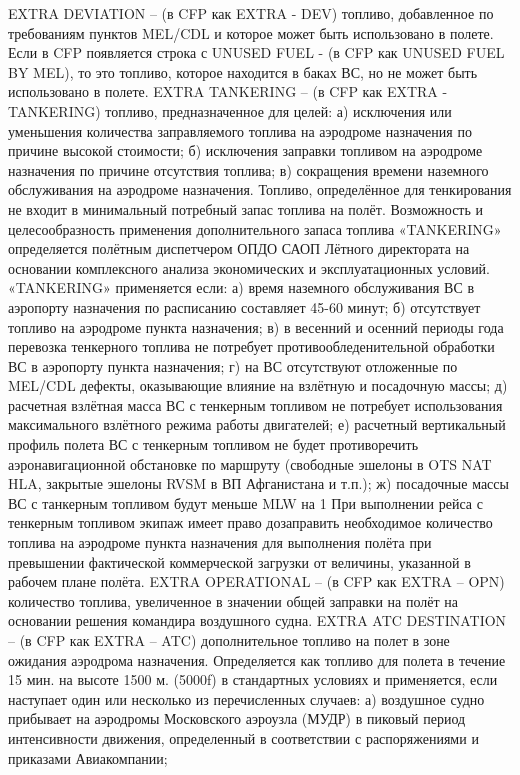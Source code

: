 EXTRA DEVIATION – (в CFP как EXTRA - DEV) топливо, добавленное по требованиям пунктов MEL/CDL и которое может быть использовано в полете. 
Если в CFP появляется строка с UNUSED FUEL - (в CFP как UNUSED FUEL BY MEL), то это топливо, которое находится в баках ВС, но не может быть использовано в полете. 
EXTRA TANKERING – (в CFP как EXTRA - TANKERING) топливо, предназначенное для целей: 
а)	исключения или уменьшения количества заправляемого топлива на аэродроме назначения по причине высокой стоимости; 
б)	исключения заправки топливом на аэродроме назначения по причине отсутствия топлива; 
в)	сокращения времени наземного обслуживания на аэродроме назначения. 
Топливо, определённое для тенкирования не входит в минимальный потребный запас топлива на полёт. 
 Возможность и целесообразность применения дополнительного запаса топлива «TANKERING» определяется полётным диспетчером ОПДО САОП Лётного директората на основании комплексного анализа экономических и эксплуатационных условий. «TANKERING» применяется если: 
а)	время наземного обслуживания ВС в аэропорту назначения по расписанию составляет 45-60 минут; 
б)	отсутствует топливо на аэродроме пункта назначения; 
в)	в весенний и осенний периоды года перевозка тенкерного топлива не потребует противообледенительной обработки ВС в аэропорту пункта назначения; 
г)	на ВС отсутствуют отложенные по MEL/CDL дефекты, оказывающие влияние на взлётную и посадочную массы; 
д)	расчетная взлётная масса ВС с тенкерным топливом не потребует использования максимального взлётного режима работы двигателей; 
е)	расчетный вертикальный профиль полета ВС с тенкерным топливом не будет противоречить аэронавигационной обстановке по маршруту (свободные эшелоны в OTS NAT HLA, закрытые эшелоны RVSM в ВП Афганистана и т.п.); 
ж)	посадочные массы ВС с танкерным топливом будут меньше MLW на 1%
При выполнении рейса с тенкерным топливом экипаж имеет право дозаправить необходимое количество топлива на аэродроме пункта назначения для выполнения полёта при превышении фактической коммерческой загрузки от величины, указанной в рабочем плане полёта. 
EXTRA OPERATIONAL – (в CFP как EXTRA – OPN) количество топлива, увеличенное в значении общей заправки на полёт на основании решения командира воздушного судна. 
EXTRA ATC DESTINATION – (в CFP как EXTRA – ATC) дополнительное топливо на полет в зоне ожидания аэродрома назначения. Определяется как топливо для полета в течение 15 мин. на высоте 1500 м. (5000f) в стандартных условиях и применяется, если наступает один или несколько из перечисленных случаев: 
а)	воздушное судно прибывает на аэродромы Московского аэроузла (МУДР) в пиковый период интенсивности движения, определенный в соответствии с распоряжениями и приказами Авиакомпании; 

